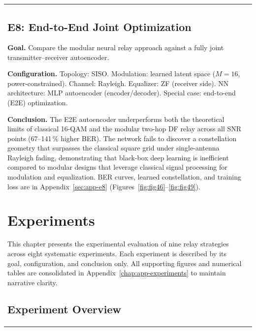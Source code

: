 {\begin{longtable}[]{@{}ll@{}}
\section{E8: End-to-End Joint Optimization}\label{sec:end-to-end-joint-optimization}

\textbf{Goal.}
Compare the modular neural relay approach against a fully joint transmitter--receiver
autoencoder.

\textbf{Configuration.}
Topology: SISO.
Modulation: learned latent space ($M{=}16$, power-constrained).
Channel: Rayleigh.
Equalizer: ZF (receiver side).
NN architecture: MLP autoencoder (encoder/decoder).
Special case: end-to-end (E2E) optimization.

\textbf{Conclusion.}
The E2E autoencoder underperforms both the theoretical limits of classical 16-QAM and
the modular two-hop DF relay across all SNR points (67--141\,\% higher BER).
The network fails to discover a constellation geometry that surpasses the classical
square grid under single-antenna Rayleigh fading, demonstrating that black-box deep
learning is inefficient compared to modular designs that leverage classical signal
processing for modulation and equalization.
BER curves, learned constellation, and training loss are in Appendix~\ref{sec:app-e8}
(Figures~\ref{fig:fig46}--\ref{fig:fig49}).%
\chapter{Experiments}\label{sec:experiments}

This chapter presents the experimental evaluation of nine relay strategies across eight
systematic experiments. Each experiment is described by its goal, configuration, and
conclusion only. All supporting figures and numerical tables are consolidated in
Appendix~\ref{chap:app-experiments} to maintain narrative clarity.

\section{Experiment Overview}\label{sec:experiment-overview}


\end{longtable}}

